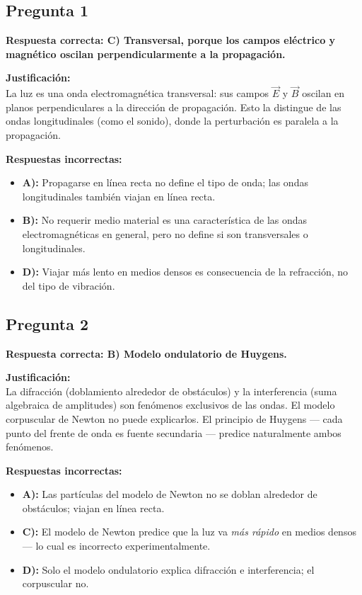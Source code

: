 \begin{respuestabox}
\subsection*{Pregunta 1}
\textcolor{verdecorrecto}{\textbf{Respuesta correcta: C) Transversal, porque los campos eléctrico y magnético oscilan perpendicularmente a la propagación.}}

\textbf{Justificación:}\\
La luz es una onda electromagnética transversal: sus campos $\vec{E}$ y $\vec{B}$ oscilan en planos perpendiculares a la dirección de propagación. Esto la distingue de las ondas longitudinales (como el sonido), donde la perturbación es paralela a la propagación.

\textbf{Respuestas incorrectas:}
\begin{itemize}
    \item \textbf{A):} Propagarse en línea recta no define el tipo de onda; las ondas longitudinales también viajan en línea recta.
    \item \textbf{B):} No requerir medio material es una característica de las ondas electromagnéticas en general, pero no define si son transversales o longitudinales.
    \item \textbf{D):} Viajar más lento en medios densos es consecuencia de la refracción, no del tipo de vibración.
\end{itemize}
\end{respuestabox}

\begin{respuestabox}
\subsection*{Pregunta 2}
\textcolor{verdecorrecto}{\textbf{Respuesta correcta: B) Modelo ondulatorio de Huygens.}}

\textbf{Justificación:}\\
La difracción (doblamiento alrededor de obstáculos) y la interferencia (suma algebraica de amplitudes) son fenómenos exclusivos de las ondas. El modelo corpuscular de Newton no puede explicarlos. El principio de Huygens — cada punto del frente de onda es fuente secundaria — predice naturalmente ambos fenómenos.

\textbf{Respuestas incorrectas:}
\begin{itemize}
    \item \textbf{A):} Las partículas del modelo de Newton no se doblan alrededor de obstáculos; viajan en línea recta.
    \item \textbf{C):} El modelo de Newton predice que la luz va \textit{más rápido} en medios densos — lo cual es incorrecto experimentalmente.
    \item \textbf{D):} Solo el modelo ondulatorio explica difracción e interferencia; el corpuscular no.
\end{itemize}
\end{respuestabox}

